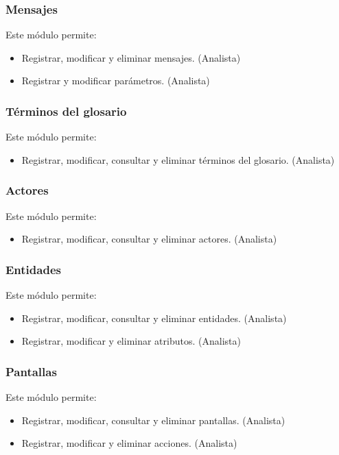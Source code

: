 \subsubsection{Mensajes}
	Este módulo permite:
	\begin{itemize}
		\item Registrar, modificar y eliminar mensajes. (Analista)
		\item Registrar y modificar parámetros. (Analista)
	\end{itemize}
	
\subsubsection{Términos del glosario}
	Este módulo permite:
	\begin{itemize}
		\item Registrar, modificar, consultar y eliminar términos del glosario. (Analista)
	\end{itemize}
	
\subsubsection{Actores}
	Este módulo permite:
	\begin{itemize}
		\item Registrar, modificar, consultar y eliminar actores. (Analista)
	\end{itemize}
	
\subsubsection{Entidades}
	Este módulo permite:
	\begin{itemize}
		\item Registrar, modificar, consultar y eliminar entidades. (Analista)
		\item Registrar, modificar y eliminar atributos. (Analista)
	\end{itemize}
	
\subsubsection{Pantallas}
	Este módulo permite:
	\begin{itemize}
		\item Registrar, modificar, consultar y eliminar pantallas. (Analista)
		\item Registrar, modificar y eliminar acciones. (Analista)
	\end{itemize}
	
